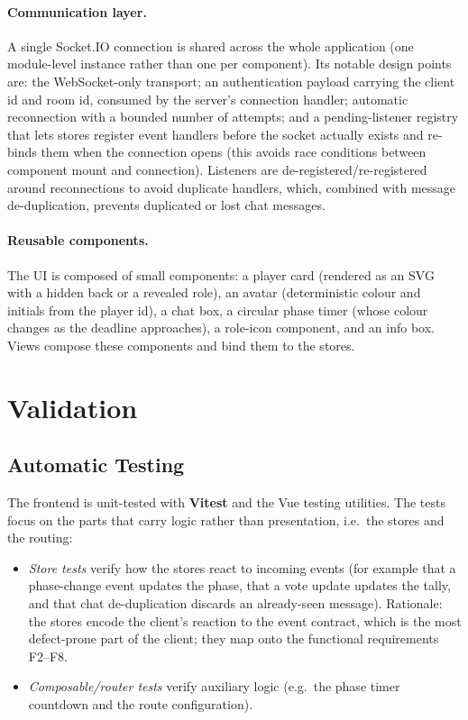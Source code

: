 \documentclass{scrartcl}
\begin{document}
\paragraph{Communication layer.} A single Socket.IO connection is shared
across the whole application (one module-level instance rather than one
per component). Its notable design points are: the WebSocket-only
transport; an authentication payload carrying the client id and room id,
consumed by the server's connection handler; automatic reconnection with
a bounded number of attempts; and a pending-listener registry that lets
stores register event handlers before the socket actually exists and
re-binds them when the connection opens (this avoids race conditions
between component mount and connection). Listeners are
de-registered/re-registered around reconnections to avoid duplicate
handlers, which, combined with message de-duplication, prevents
duplicated or lost chat messages.

\paragraph{Reusable components.} The UI is composed of small components:
a player card (rendered as an SVG with a hidden back or a revealed
role), an avatar (deterministic colour and initials from the player id),
a chat box, a circular phase timer (whose colour changes as the deadline
approaches), a role-icon component, and an info box. Views compose these
components and bind them to the stores.

\section{Validation}\label{validation}

\subsection{Automatic Testing}\label{automatic-testing}

The frontend is unit-tested with \textbf{Vitest} and the Vue testing
utilities. The tests focus on the parts that carry logic rather than
presentation, i.e.\ the stores and the routing:

\begin{itemize}
  \item \emph{Store tests} verify how the stores react to incoming
  events (for example that a phase-change event updates the phase, that
  a vote update updates the tally, and that chat de-duplication discards
  an already-seen message). Rationale: the stores encode the client's
  reaction to the event contract, which is the most defect-prone part of
  the client; they map onto the functional requirements F2--F8.

  \item \emph{Composable/router tests} verify auxiliary logic (e.g.\ the
  phase timer countdown and the route configuration).
\end{itemize}
\end{document}
